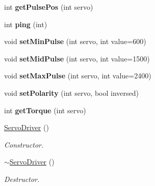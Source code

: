 \begin{DoxyCompactItemize}
\mbox{\label{classServoDriver_a716d64d7b2203c9cb8dff5c90d0a5dd9}} 
int {\bfseries get\+Pulse\+Pos} (int servo)
\item 
\mbox{\label{classServoDriver_afc853f7f2f46acb7e4721f4ce4314522}} 
int {\bfseries ping} (int)
\item 
\mbox{\label{classServoDriver_a40ec259cb0ced3154b1e73cc52d48938}} 
void {\bfseries set\+Min\+Pulse} (int servo, int value=600)
\item 
\mbox{\label{classServoDriver_a92d53f7f50a7eb95e14ae358ad0b7d23}} 
void {\bfseries set\+Mid\+Pulse} (int servo, int value=1500)
\item 
\mbox{\label{classServoDriver_aaaeaab97cef5c2ebcd05c265fdff747f}} 
void {\bfseries set\+Max\+Pulse} (int servo, int value=2400)
\item 
\mbox{\label{classServoDriver_a89b2add38109f20260369e0a0d747bf2}} 
void {\bfseries set\+Polarity} (int servo, bool inversed)
\item 
\mbox{\label{classServoDriver_a108cce4f0dcf60bf443ee932621bc89c}} 
int {\bfseries get\+Torque} (int servo)
\item 
\mbox{\label{classServoDriver_a2076bae148e26ee3f854f1f1984d9714}} 
\hyperlink{classServoDriver_a2076bae148e26ee3f854f1f1984d9714}{Servo\+Driver} ()
\begin{DoxyCompactList}\small\item\em Constructor. \end{DoxyCompactList}\item 
\mbox{\label{classServoDriver_acf6cad7d5b891fbe4ff44eaec8409db7}} 
\hyperlink{classServoDriver_acf6cad7d5b891fbe4ff44eaec8409db7}{$\sim$\+Servo\+Driver} ()
\begin{DoxyCompactList}\small\item\em Destructor. \end{DoxyCompactList}\item 
\mbox{\label{classServoDriver_af580283b3d1765c9a27276e9a870cf88}} 

\end{DoxyCompactItemize}
